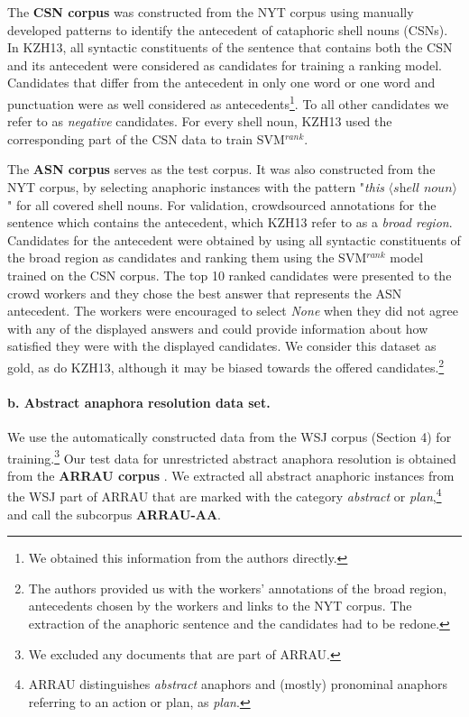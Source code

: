 \documentclass[11pt,letterpaper]{article}
\begin{document}
The {\bf CSN corpus} was constructed from the NYT corpus using manually developed patterns to identify the antecedent of cataphoric shell nouns (CSNs). In KZH13, all syntactic constituents of the sentence that contains both the CSN and its antecedent were considered as candidates for training a ranking model. Candidates that differ from the antecedent in only one word or one word and punctuation were as well considered as antecedents\footnote{We obtained this information from the authors directly.}. To all other candidates we refer to as \textit{negative} candidates. For every shell noun, KZH13 used the corresponding part of the CSN data to train SVM$^{rank}$.


The {\bf ASN corpus} serves as the test corpus. It was also constructed from
 the NYT corpus, by selecting anaphoric instances with the pattern "\textit{this} $\langle \textit{shell noun} \rangle$" for all covered shell nouns. For validation, \citet{kolhatkar-zinsmeister-hirst:2013:LAW7-ID} crowdsourced annotations for the sentence which contains the antecedent, which KZH13 refer to as 
 a \textit{broad region}. Candidates for the antecedent were obtained by using all syntactic constituents of the broad region as candidates and ranking them using the SVM$^{rank}$ model trained on the CSN corpus. The top 10 ranked candidates were presented to the crowd workers and they chose the best answer that represents the ASN antecedent. The workers were encouraged to select \textit{None} when they did not agree with any of the displayed answers and could provide information about how satisfied they were with the displayed candidates. We consider this dataset as gold, as do KZH13, although it may be biased towards the offered candidates.\footnote{The authors provided us with the workers' annotations of the broad region, antecedents chosen by the workers and links to the NYT corpus. The extraction of the anaphoric sentence and the candidates had to be redone.}

\paragraph{b. Abstract anaphora resolution data set.} 
 We use the automatically constructed data 
from the WSJ corpus (Section 4) for training.\footnote{We excluded any documents that are part of ARRAU.} 
Our test data for unrestricted abstract anaphora resolution is obtained from the {\bf ARRAU corpus} \citep{uryupina2016arrau}. We extracted all abstract anaphoric instances from the WSJ part of ARRAU that are marked with the category \textit{abstract} or \textit{plan},\footnote{ARRAU distinguishes  {\em abstract} anaphors and (mostly) pronominal anaphors referring to an action or plan, as {\em plan}.} and call the
subcorpus {\bf ARRAU-AA}. 
\end{document}
